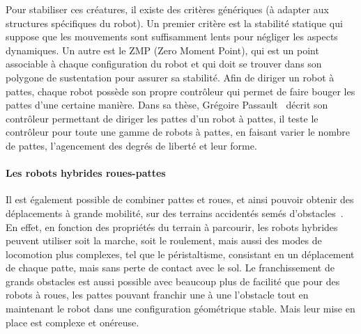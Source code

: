                 Pour stabiliser ces créatures, il existe des critères génériques (à adapter aux structures spécifiques du robot). Un premier critère est la stabilité statique qui suppose que les mouvements sont suffisamment lents pour négliger les aspects dynamiques. Un autre est le ZMP (Zero Moment Point), qui est un point associable à chaque configuration du robot et qui doit se trouver dans son polygone de sustentation pour assurer sa stabilité.
                Afin de diriger un robot à pattes, chaque robot possède son propre contrôleur qui permet de faire bouger les pattes d'une certaine manière. Dans sa thèse, Grégoire Passault~ décrit son contrôleur permettant de diriger les pattes d'un robot à pattes, il teste le contrôleur pour toute une gamme de robots à pattes, en faisant varier le nombre de pattes, l'agencement des degrés de liberté et leur forme.
            \paragraph{Les robots hybrides roues-pattes}
                Il est également possible de combiner pattes et roues, et ainsi pouvoir obtenir des déplacements à grande mobilité, sur des terrains accidentés semés d'obstacles~. En effet, en fonction des propriétés du terrain à parcourir, les robots hybrides peuvent utiliser soit la marche, soit le roulement, mais aussi des modes de locomotion plus complexes, tel que le péristaltisme, consistant en un déplacement de chaque patte, mais sans perte de contact avec le sol. 
                Le franchissement de grands obstacles est aussi possible avec beaucoup plus de facilité que pour des robots à roues, les pattes pouvant franchir une à une l'obstacle tout en maintenant le robot dans une configuration géométrique stable. 
                Mais leur mise en place est complexe et onéreuse.
